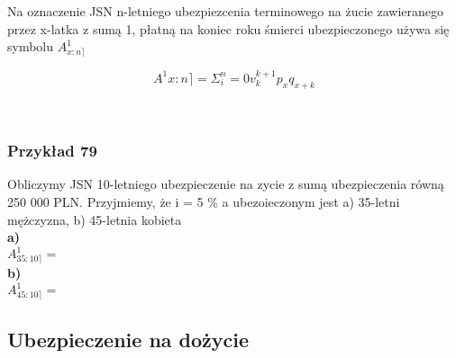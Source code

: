 \documentclass{article}
\begin{document}
Na oznaczenie JSN n-letniego ubezpiezcenia terminowego na żucie zawieranego przez x-latka z sumą 1, płatną na koniec roku śmierci ubezpieczonego używa się symbolu $ A^1_{x:n \rceil} $\\

\begin{center}
	\begin{equation}
		A^1_{}x:n \rceil = \Sigma ^{n}_i=0 v^{k+1} _kp_x q_{x+k}
	\end{equation}
\end{center}\\

\subsubsection{Przykład 79}

Obliczymy JSN 10-letniego ubezpieczenie na zycie z sumą ubezpieczenia równą 250 000 PLN. Przyjmiemy, że i = 5 \% a ubezoieczonym jest a) 35-letni mężczyzna, b) 45-letnia kobieta\\

\textbf{a)}\\

$ A^1_{35:10 \rceil} = $\\

\textbf{b)}\\

$ A^1_{45:10 \rceil} =  $\\

\subsection{Ubezpieczenie na dożycie}
\end{document}
